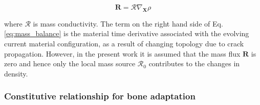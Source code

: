 \documentclass[review]{elsarticle}
\numberwithin{equation}{section}
\begin{document}
\begin{equation}
\mathbf{R} = \mathcal{R} \nabla_\mathbf{X} \rho
\label{eq:mass_flux}
\end{equation}

where $\mathcal{R}$ is mass conductivity. The term on the right hand side of Eq. \ref{eq:mass_balance}
is the material time derivative associated with the evolving current material
configuration, as a result of changing topology due to crack propagation. 
However, in the present work it is assumed that the mass flux $\mathbf{R}$ is zero and hence only the local mass source $\mathcal{R}_0$ contributes to the changes in density.


%
%

\subsubsection{Constitutive relationship for bone adaptation}

\label{sec:constitutive_eq}
\end{document}
